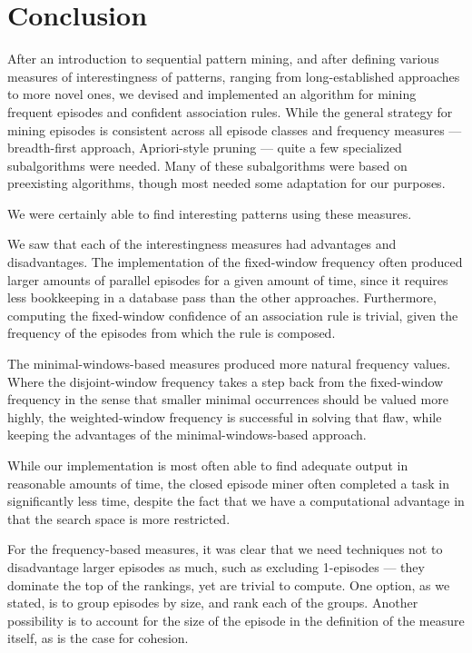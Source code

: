 \chapter{Conclusion}


After an introduction to sequential pattern mining, and after defining various measures of interestingness of patterns, ranging from long-established approaches to more novel ones, we devised and implemented an algorithm for mining frequent episodes and confident association rules. While the general strategy for mining episodes is consistent across all episode classes and frequency measures --- breadth-first approach, Apriori-style pruning --- quite a few specialized subalgorithms were needed. Many of these subalgorithms were based on preexisting algorithms, though most needed some adaptation for our purposes.


We were certainly able to find interesting patterns using these measures.

We saw that each of the interestingness measures had advantages and disadvantages. The implementation of the fixed-window frequency often produced larger amounts of parallel episodes for a given amount of time, since it requires less bookkeeping in a database pass than the other approaches. Furthermore, computing the fixed-window confidence of an association rule is trivial, given the frequency of the episodes from which the rule is composed.

The minimal-windows-based measures produced more natural frequency values. Where the disjoint-window frequency takes a step back from the fixed-window frequency in the sense that smaller minimal occurrences should be valued more highly, the weighted-window frequency is successful in solving that flaw, while keeping the advantages of the minimal-windows-based approach.


While our implementation is most often able to find adequate output in reasonable amounts of time, the closed episode miner often completed a task in significantly less time, despite the fact that we have a computational advantage in that the search space is more restricted.

For the frequency-based measures, it was clear that we need techniques not to disadvantage larger episodes as much, such as excluding 1-episodes --- they dominate the top of the rankings, yet are trivial to compute. One option, as we stated, is to group episodes by size, and rank each of the groups. Another possibility is to account for the size of the episode in the definition of the measure itself, as is the case for cohesion.

